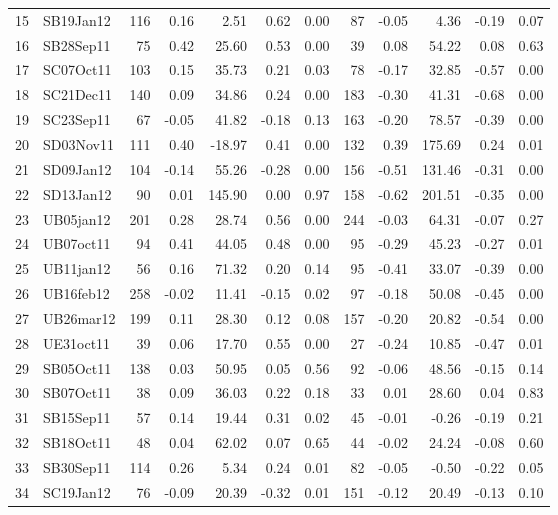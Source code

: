\documentclass[]{article}
\begin{document}
\begin{table}[ht]
\begin{tabular}{rlrrrrrrrrrr}
  15 & SB19Jan12 & 116 & 0.16 & 2.51 & 0.62 & 0.00 &  87 & -0.05 & 4.36 & -0.19 & 0.07 \\ 
  16 & SB28Sep11 &  75 & 0.42 & 25.60 & 0.53 & 0.00 &  39 & 0.08 & 54.22 & 0.08 & 0.63 \\ 
  17 & SC07Oct11 & 103 & 0.15 & 35.73 & 0.21 & 0.03 &  78 & -0.17 & 32.85 & -0.57 & 0.00 \\ 
  18 & SC21Dec11 & 140 & 0.09 & 34.86 & 0.24 & 0.00 & 183 & -0.30 & 41.31 & -0.68 & 0.00 \\ 
  19 & SC23Sep11 &  67 & -0.05 & 41.82 & -0.18 & 0.13 & 163 & -0.20 & 78.57 & -0.39 & 0.00 \\ 
  20 & SD03Nov11 & 111 & 0.40 & -18.97 & 0.41 & 0.00 & 132 & 0.39 & 175.69 & 0.24 & 0.01 \\ 
  21 & SD09Jan12 & 104 & -0.14 & 55.26 & -0.28 & 0.00 & 156 & -0.51 & 131.46 & -0.31 & 0.00 \\ 
  22 & SD13Jan12 &  90 & 0.01 & 145.90 & 0.00 & 0.97 & 158 & -0.62 & 201.51 & -0.35 & 0.00 \\ 
  23 & UB05jan12 & 201 & 0.28 & 28.74 & 0.56 & 0.00 & 244 & -0.03 & 64.31 & -0.07 & 0.27 \\ 
  24 & UB07oct11 &  94 & 0.41 & 44.05 & 0.48 & 0.00 &  95 & -0.29 & 45.23 & -0.27 & 0.01 \\ 
  25 & UB11jan12 &  56 & 0.16 & 71.32 & 0.20 & 0.14 &  95 & -0.41 & 33.07 & -0.39 & 0.00 \\ 
  26 & UB16feb12 & 258 & -0.02 & 11.41 & -0.15 & 0.02 &  97 & -0.18 & 50.08 & -0.45 & 0.00 \\ 
  27 & UB26mar12 & 199 & 0.11 & 28.30 & 0.12 & 0.08 & 157 & -0.20 & 20.82 & -0.54 & 0.00 \\ 
  28 & UE31oct11 &  39 & 0.06 & 17.70 & 0.55 & 0.00 &  27 & -0.24 & 10.85 & -0.47 & 0.01 \\ 
  29 & SB05Oct11 & 138 & 0.03 & 50.95 & 0.05 & 0.56 &  92 & -0.06 & 48.56 & -0.15 & 0.14 \\ 
  30 & SB07Oct11 &  38 & 0.09 & 36.03 & 0.22 & 0.18 &  33 & 0.01 & 28.60 & 0.04 & 0.83 \\ 
  31 & SB15Sep11 &  57 & 0.14 & 19.44 & 0.31 & 0.02 &  45 & -0.01 & -0.26 & -0.19 & 0.21 \\ 
  32 & SB18Oct11 &  48 & 0.04 & 62.02 & 0.07 & 0.65 &  44 & -0.02 & 24.24 & -0.08 & 0.60 \\ 
  33 & SB30Sep11 & 114 & 0.26 & 5.34 & 0.24 & 0.01 &  82 & -0.05 & -0.50 & -0.22 & 0.05 \\ 
  34 & SC19Jan12 &  76 & -0.09 & 20.39 & -0.32 & 0.01 & 151 & -0.12 & 20.49 & -0.13 & 0.10 \\ 

\end{tabular}
\end{table}
\end{document}
